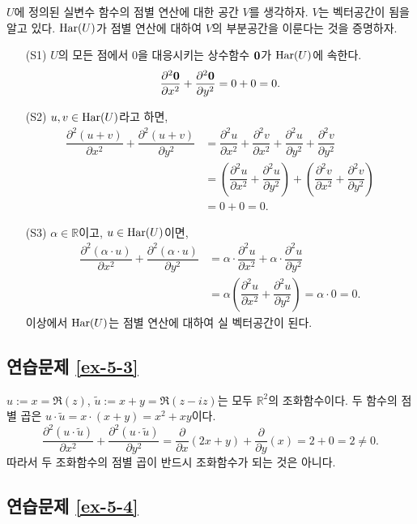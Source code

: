 $U$에 정의된 실변수 함수의 점별 연산에 대한 공간 $V$를 생각하자.
$V$는 벡터공간이 됨을 알고 있다.
$\mathop{\mathrm{Har}}(U)$가 점별 연산에 대하여 $V$의 부분공간을 이룬다는 것을 증명하자.
\begin{itemize}
\item[(S1)]
$U$의 모든 점에서 $0$을 대응시키는 상수함수 $\boldsymbol 0$가 $\mathop{\mathrm{Har}}(U)$에 속한다.
\[
\displaystyle\frac{\partial^2 \boldsymbol 0}{\partial x^2} + \displaystyle\frac{\partial^2 \boldsymbol 0}{\partial y^2} = 0+0=0.
\]
\item[(S2)] $u,v\in \mathop{\mathrm{Har}}(U)$라고 하면,
\begin{align*}
\dfrac{\partial^2 (u+v)}{\partial x^2} + \dfrac{\partial^2 (u+v)}{\partial y^2}
&= \dfrac{\partial^2 u}{\partial x^2} + \dfrac{\partial^2 v}{\partial x^2}
+ \dfrac{\partial^2 u}{\partial y^2}+ \dfrac{\partial^2 v}{\partial y^2} \\ 
&= \left(\dfrac{\partial^2 u}{\partial x^2} + \dfrac{\partial^2 u}{\partial y^2} \right)
+ \left( \dfrac{\partial^2 v}{\partial x^2} + \dfrac{\partial^2 v}{\partial y^2} \right) \\
&= 0+0=0.
\end{align*}
\item[(S3)] $\alpha\in\mathbb R$이고, $u\in\mathop{\mathrm{Har}}(U)$이면,
\begin{align*}
\dfrac{\partial^2 (\alpha\cdot u)}{\partial x^2} + \dfrac{\partial^2 (\alpha\cdot u)}{\partial y^2}
&= \alpha\cdot \dfrac{\partial^2 u}{\partial x^2} 
+ \alpha \cdot \dfrac{\partial^2 u}{\partial y^2} \\
&= \alpha \left( \dfrac{\partial^2 u}{\partial x^2} + \dfrac{\partial^2 u}{\partial y^2} \right)
= \alpha\cdot 0 = 0.
\end{align*}
이상에서 $\mathop{\mathrm{Har}}(U)$는 점별 연산에 대하여 실 벡터공간이 된다.
\end{itemize}

\subsection*{연습문제 \ref{ex-5-3}}

$u:=x=\Re(z)$, $\tilde u:= x+y = \Re(z-iz)$는 모두 $\mathbb R^2$의
조화함수이다.
두 함수의 점별 곱은 $u\cdot \tilde u = x\cdot(x+y) = x^2 +xy$이다.
\[
\dfrac{\partial^2 (u\cdot \tilde u)}{\partial x^2} 
+ \dfrac{\partial^2 (u\cdot \tilde u)}{\partial y^2}
= \dfrac{\partial}{\partial x}(2x+y) + \dfrac{\partial}{\partial y}(x) = 2 + 0 = 2\ne 0.
\]
따라서 두 조화함수의 점별 곱이 반드시 조화함수가 되는 것은 아니다.

\subsection*{연습문제 \ref{ex-5-4}}

